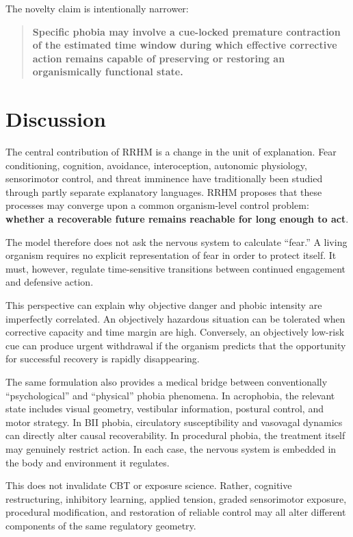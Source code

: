 \documentclass[11pt]{article}
\begin{document}
The novelty claim is intentionally narrower:

\begin{quote}
\textbf{Specific phobia may involve a cue-locked premature contraction of the estimated time window during which effective corrective action remains capable of preserving or restoring an organismically functional state.}
\end{quote}

\section{Discussion}

The central contribution of RRHM is a change in the unit of explanation. Fear conditioning, cognition, avoidance, interoception, autonomic physiology, sensorimotor control, and threat imminence have traditionally been studied through partly separate explanatory languages. RRHM proposes that these processes may converge upon a common organism-level control problem: \textbf{whether a recoverable future remains reachable for long enough to act}.

The model therefore does not ask the nervous system to calculate ``fear.'' A living organism requires no explicit representation of fear in order to protect itself. It must, however, regulate time-sensitive transitions between continued engagement and defensive action.

This perspective can explain why objective danger and phobic intensity are imperfectly correlated. An objectively hazardous situation can be tolerated when corrective capacity and time margin are high. Conversely, an objectively low-risk cue can produce urgent withdrawal if the organism predicts that the opportunity for successful recovery is rapidly disappearing.

The same formulation also provides a medical bridge between conventionally ``psychological'' and ``physical'' phobia phenomena. In acrophobia, the relevant state includes visual geometry, vestibular information, postural control, and motor strategy. In BII phobia, circulatory susceptibility and vasovagal dynamics can directly alter causal recoverability. In procedural phobia, the treatment itself may genuinely restrict action. In each case, the nervous system is embedded in the body and environment it regulates.

This does not invalidate CBT or exposure science. Rather, cognitive restructuring, inhibitory learning, applied tension, graded sensorimotor exposure, procedural modification, and restoration of reliable control may all alter different components of the same regulatory geometry.
\end{document}
